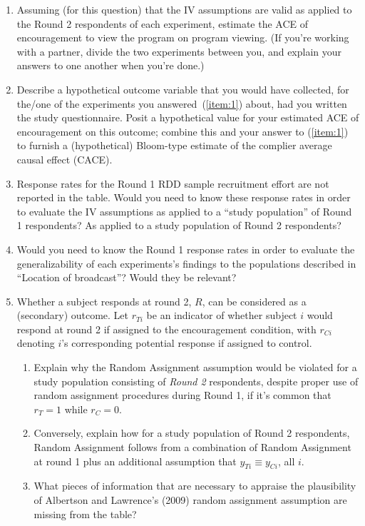 \documentclass{article}
\begin{document}
\begin{enumerate}
\item \label{item:1}Assuming (for this question) that the IV assumptions are valid as applied to the Round 2 respondents of each experiment, estimate the ACE of encouragement to view the program on program viewing. (If you're working with a partner, divide the two experiments between you, and explain your answers to one another when you're done.)
\item Describe a hypothetical outcome variable that you would have collected, for the/one of the experiments you answered~(\ref{item:1}) about,  had you written the study questionnaire. Posit a hypothetical value for your estimated ACE of encouragement on this outcome; combine this and your answer to (\ref{item:1}) to furnish a (hypothetical) Bloom-type estimate of the complier average causal effect (CACE).  
\item Response rates for the Round 1 RDD sample recruitment effort are not reported in the table. Would you need to know these response rates in order to evaluate the IV assumptions as applied to a ``study population'' of Round 1 respondents?  As applied to a study population of Round 2 respondents? 
\item Would you need to know the Round 1 response rates in order to evaluate the generalizability of each experiments's findings to the populations described in ``Location of broadcast''?  Would they be relevant?  
\item Whether a subject responds at round 2, $R$, can be considered as a (secondary) outcome. Let $r_{Ti}$ be an indicator of whether subject $i$ would respond at round 2 if assigned to the encouragement condition, with $r_{Ci}$ denoting $i$'s corresponding potential response if assigned to control.
  \begin{enumerate}
  \item Explain why the Random Assignment assumption would be violated for a study population consisting of \textit{Round 2} respondents, despite proper use of random assignment procedures during Round 1, if it's common that $r_{T}=1$ while $r_{C}=0$.
  \item Conversely, explain how for a study population of Round 2 respondents, Random Assignment follows from a combination of Random Assignment at round 1 plus an additional assumption that $y_{Ti} \equiv y_{Ci}$, all $i$. 
  \item What pieces of information that are necessary to appraise the plausibility of Albertson and Lawrence's (2009) random assignment assumption are missing from the table? 
  \end{enumerate}

\end{enumerate}
\end{document}
